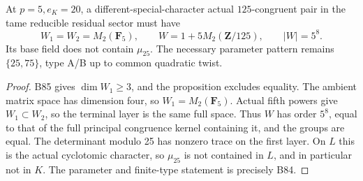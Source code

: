 \begin{corollary}
\label{cor:B-RD87-full}
At \(p=5,e_K=20\), a different-special-character
actual \(125\)-congruent pair in the tame reducible
residual sector must have
\[
    W_1=W_2=M_2(\mathbf F_5),\qquad
    W=1+5M_2(\mathbf Z/125),\qquad |W|=5^8.           \tag{B-RD87.10}
\]
Its base field does not contain \(\mu_{25}\).
The necessary parameter pattern remains
\(\{25,75\}\), type A/B up to common quadratic twist.
\end{corollary}
\begin{proof}
B85 gives \(\dim W_1\ge3\), and the proposition
excludes equality. The ambient matrix space has
dimension four, so \(W_1=M_2(\mathbf F_5)\).
Actual fifth powers give \(W_1\subset W_2\),
so the terminal layer is the same full space.
Thus \(W\) has order \(5^8\), equal to that of
the full principal congruence kernel containing
it, and the groups are equal. The determinant
modulo 25 has nonzero trace on the first layer.
On \(L\) this is the actual cyclotomic character,
so \(\mu_{25}\) is not contained in \(L\), and
in particular not in \(K\). The parameter and
finite-type statement is precisely B84.
\end{proof}

